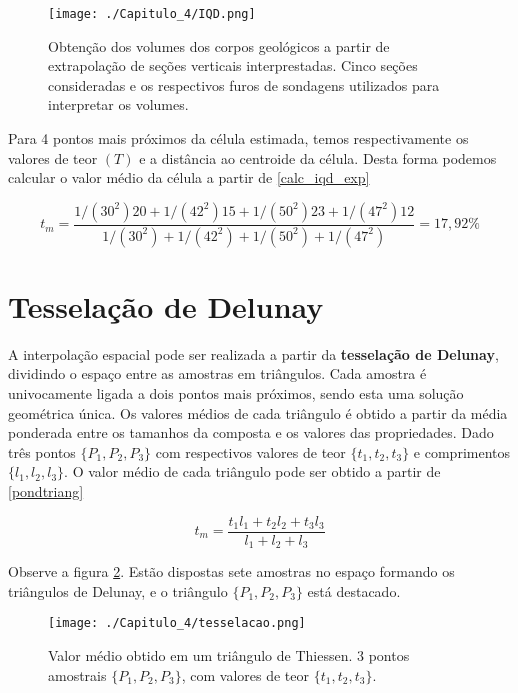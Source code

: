 \FloatBarrier
\begin{figure}[!htpb]
	\centering
	\texttt{[image: ./Capitulo\_4/IQD.png]}	
	\caption{Obtenção dos volumes dos corpos geológicos a partir de extrapolação de seções verticais interprestadas. Cinco seções consideradas e os respectivos furos de sondagens utilizados para interpretar os volumes. }
	\label{IQD}
\end{figure}
\FloatBarrier 

 Para 4 pontos mais próximos da célula estimada, temos respectivamente os valores de teor $(T)$ e a distância ao centroide da célula. Desta forma podemos calcular o valor médio da célula a partir de \eqref{calc_iqd_exp}

\begin{equation}\label{calc_iqd_exp}
t_{m} = \frac{1/(30^{2})20 + 1/(42^{2})15 + 1/(50^{2})23 + 1/(47^{2})12 }{1/(30^{2}) + 1/(42^{2}) + 1/(50^{2}) + 1/(47^{2}) } =17,92\%
\end{equation}

\section{Tesselação de Delunay} 

A interpolação espacial pode ser realizada a partir da \textbf{tesselação de Delunay}, dividindo o espaço entre as amostras em triângulos. Cada amostra é univocamente ligada a dois pontos mais próximos, sendo esta uma solução geométrica única. Os valores médios de cada triângulo é obtido a partir da média ponderada entre os tamanhos da composta e os valores das propriedades. Dado três pontos $\{ P_{1}, P_{2}, P_{3} \}$ com respectivos valores de teor $\{ t_{1}, t_{2}, t_{3} \}$ e comprimentos $\{ l_{1}, l_{2}, l_{3} \}$. O valor médio de cada triângulo pode ser obtido a partir de \eqref{pondtriang}

\begin{equation} \label{pondtriang} 
	t_{m} = \frac{t_{1}l_{1} + t_{2}l_{2} + t_{3}l_{3} }{l_{1} + l_{2} + l_{3}}
\end{equation}

Observe a figura \ref{tesselacao}. Estão dispostas sete amostras no espaço formando os triângulos de Delunay, e o triângulo $\{P_{1}, P_{2}, P_{3}\}$ está destacado.

\FloatBarrier
\begin{figure}[!htpb]
	\centering
	\texttt{[image: ./Capitulo\_4/tesselacao.png]}	
	\caption{Valor médio obtido em um triângulo de Thiessen. 3 pontos amostrais $\{P_{1},P_{2},P_{3}\}$, com valores de teor $\{t_{1},t_{2},t_{3}\}$. }
	\label{tesselacao}
\end{figure}
\FloatBarrier 

